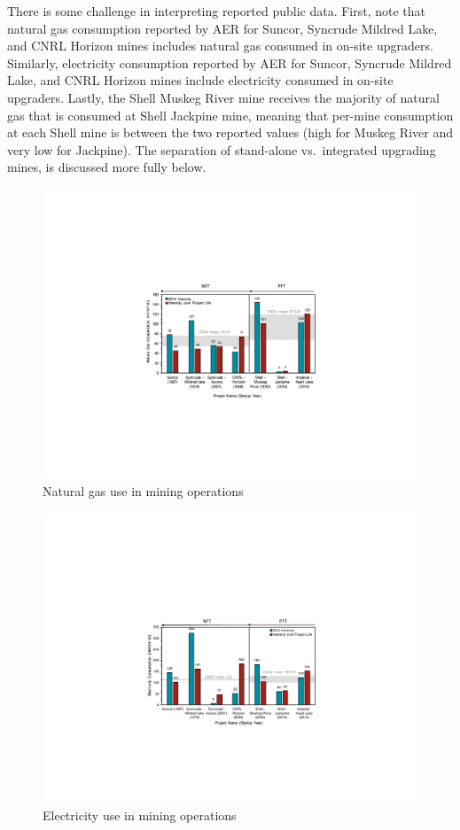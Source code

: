 \documentclass[11pt]{report}
\begin{document}
There is some challenge in interpreting reported public data. First, note that natural gas consumption reported by AER for Suncor, Syncrude Mildred Lake, and CNRL Horizon mines includes natural gas consumed in on-site upgraders. Similarly, electricity consumption reported by AER for Suncor, Syncrude Mildred Lake, and CNRL Horizon mines include electricity consumed in on-site upgraders. Lastly, the Shell Muskeg River mine receives the majority of natural gas that is consumed at Shell Jackpine mine, meaning that per-mine consumption at each Shell mine is between the two reported values (high for Muskeg River and very low for Jackpine).  The separation of stand-alone vs.\ integrated upgrading mines, is discussed more fully below.


\begin{figure}[t]
\includegraphics[width=1\columnwidth]{images/mining_ng.pdf}
\caption{Natural gas use in mining operations}
\label{fig:mining_ng}
\end{figure}


\begin{figure}[t]
\includegraphics[width=1\columnwidth]{images/mining_elec.pdf}
\caption{Electricity use in mining operations}
\label{fig:mining_elec}
\end{figure}
\end{document}
